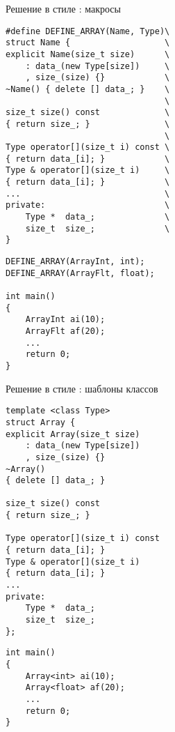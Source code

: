 \documentclass{beamer}
\begin{document}
\begin{frame}[fragile]{Решение в стиле \langc: макросы}
\small
\begin{minipage}{.5\textwidth}
    \begin{lstlisting}
#define DEFINE_ARRAY(Name, Type)\
struct Name {                   \
explicit Name(size_t size)      \
    : data_(new Type[size])     \
    , size_(size) {}            \
~Name() { delete [] data_; }    \
                                \
size_t size() const             \
{ return size_; }               \
                                \
Type operator[](size_t i) const \
{ return data_[i]; }            \
Type & operator[](size_t i)     \ 
{ return data_[i]; }            \
...                             \
private:                        \
    Type *  data_;              \
    size_t  size_;              \
}
    \end{lstlisting}
\end{minipage}\hspace{.03\textwidth}%
\begin{minipage}{.45\textwidth}
    \begin{lstlisting}
DEFINE_ARRAY(ArrayInt, int);
DEFINE_ARRAY(ArrayFlt, float);

int main()
{
    ArrayInt ai(10);
    ArrayFlt af(20);
    ...
    return 0;
}
    \end{lstlisting}
\end{minipage}
\end{frame}

\begin{frame}[fragile]{Решение в стиле \langcpp: шаблоны классов}
\small
\begin{minipage}{.5\textwidth}
    \begin{lstlisting}
template <class Type>
struct Array {                               
explicit Array(size_t size)      
    : data_(new Type[size])     
    , size_(size) {}                              
~Array()                        
{ delete [] data_; }            
                                
size_t size() const             
{ return size_; }               
                                
Type operator[](size_t i) const 
{ return data_[i]; }            
Type & operator[](size_t i)      
{ return data_[i]; }            
...                             
private:                        
    Type *  data_;              
    size_t  size_;              
};
    \end{lstlisting}
\end{minipage}\hspace{.03\textwidth}%
\begin{minipage}{.45\textwidth}
    \begin{lstlisting}
int main()
{
    Array<int> ai(10);
    Array<float> af(20);
    ...       
    return 0;
}
    \end{lstlisting}
\end{minipage}
\end{frame}
\end{document}
